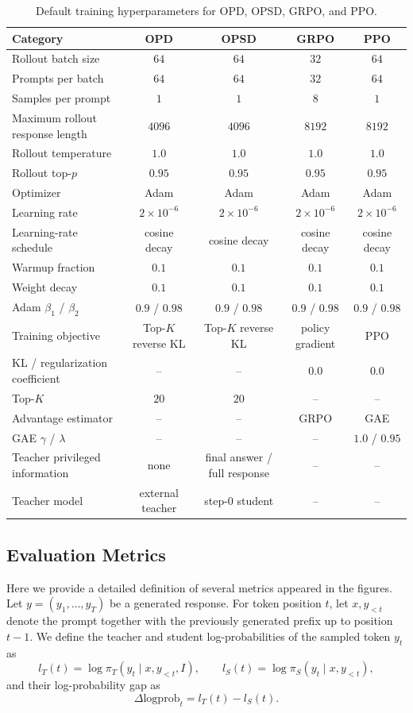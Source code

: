 \begin{table}[h]
\centering
\small
\setlength{\tabcolsep}{4pt}
\begin{tabular}{lcccc}
\toprule
\textbf{Category} & \textbf{OPD} & \textbf{OPSD} & \textbf{GRPO} & \textbf{PPO} \\
\midrule
Rollout batch size & $64$ & $64$ & $32$ & $64$ \\
Prompts per batch & $64$ & $64$ & $32$ & $64$ \\
Samples per prompt & $1$ & $1$ & $8$ & $1$ \\
Maximum rollout response length & $4096$ & $4096$ & $8192$ & $8192$ \\
Rollout temperature & $1.0$ & $1.0$ & $1.0$ & $1.0$ \\
Rollout top-$p$ & $0.95$ & $0.95$ & $0.95$ & $0.95$ \\
\midrule
Optimizer & Adam & Adam & Adam & Adam \\
Learning rate & $2\times 10^{-6}$ & $2\times 10^{-6}$ & $2\times 10^{-6}$ & $2\times 10^{-6}$ \\
Learning-rate schedule & cosine decay & cosine decay & cosine decay & cosine decay \\
Warmup fraction & $0.1$ & $0.1$ & $0.1$ & $0.1$ \\
Weight decay & $0.1$ & $0.1$ & $0.1$ & $0.1$ \\
Adam $\beta_1$ / $\beta_2$ & $0.9$ / $0.98$ & $0.9$ / $0.98$ & $0.9$ / $0.98$ & $0.9$ / $0.98$ \\
\midrule
Training objective & Top-$K$ reverse KL & Top-$K$ reverse KL & policy gradient & PPO \\
KL / regularization coefficient & -- & -- & $0.0$ & $0.0$ \\
Top-$K$ & $20$ & $20$ & -- & -- \\
Advantage estimator & -- & -- & GRPO & GAE \\
GAE $\gamma$ / $\lambda$ & -- & -- & -- & $1.0$ / $0.95$ \\
Teacher privileged information & none & final answer / full response & -- & -- \\
Teacher model & external teacher & step-0 student & -- & -- \\
\bottomrule
\end{tabular}
\vspace{2mm}
\caption{Default training hyperparameters for OPD, OPSD, GRPO, and PPO.}
\label{tab:train_hparams}
\end{table}


\subsection{Evaluation Metrics}
Here we provide a detailed definition of several metrics appeared in the figures. Let \(y=(y_1,\dots,y_T)\) be a generated response. For token position \(t\), let \(x,y_{<t}\) denote the prompt together with the previously generated prefix up to position \(t-1\). We define the teacher and student log-probabilities of the sampled token \(y_t\) as
\[
l_T(t)=\log \pi_T(y_t\mid x,y_{<t},I),
\qquad
l_S(t)=\log \pi_S(y_t\mid x,y_{<t}),
\]
and their log-probability gap as
\[
\Delta \text{logprob}_t=l_T(t)-l_S(t).
\]

